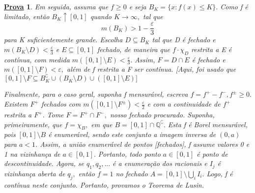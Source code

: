 \documentclass{article}
\newtheorem*{proof*}{\underline{Prova}}
\begin{document}
\begin{proof*}
  Em seguida, assuma que \(f\geq 0\) e seja \(B_{K} = \{x: f(x) \leq K\}.\) Como f é limitado, então \(B_{K}\uparrow [0, 1]\) quando \(K\to \infty,\) tal que 
    \[
      m(B_{K}) > 1 - \frac{\varepsilon }{3}
    \]
    para K suficientemente grande. Escolha \(D\subseteq B_{K}\) tal que D é fechado e \(m(B_{K}\setminus{D}) < \frac{\varepsilon }{3}\) e \(E\subseteq [0, 1]\) fechado, de maneira que 
    \(f \cdot \chi_{D}\) restrita a E é contínua, com medida \(m([0, 1]\setminus{E}) < \frac{\varepsilon }{3}.\) Assim, \(F = D\cap E\) é fechado e \(m([0, 1]\setminus{F}) < \varepsilon ,\) 
    além de f restrita a F ser contínua. [Aqui, foi usado que \([0,1]\setminus{F}\subseteq B_{K}^{\complement}\cup (B_{K}\setminus{D})\cup ([0, 1]\setminus{E})]\)

    Finalmente, para o caso geral, suponha f mensurável, escreva \(f = f^{+} - f^{-}, f^{\pm} \geq 0.\) Existem \(F^{+}\) fechados com \(m([0, 1]\setminus{F^{\pm}}) < \frac{\varepsilon }{2}\) e com a continuidade 
    de \(f^{+}\) restrita a \(F^{+}.\) Tome \(F = F^{+}\cap F^{-},\) nosso fechado procurado. Suponha, primeiramente, que \(f=\chi_{B},\) em que \(B = [0, 1]\cap \mathbb{Q}^{\complement}.\) Esta f é Borel mensurável, pois 
    \([0, 1]\setminus{B}\) é enumerável, sendo este conjunto a imagem inversa de \((0, a)\) para \(a < 1\). Assim, a união enumerável de pontos [fechados], f assume valores 0 e 1 na vizinhança de \(a\in [0, 1].\) Portanto, 
    todo ponto \(a\in [0, 1]\) é ponto de descontinuidade. Agora, se \(q_1, q_2, \dotsc \) é a enumeração dos racionais e \(I_{j}\) é vizinhança aberta de \(q_{j},\) então \(f=1\) no fechado \(A = [0, 1]\setminus{\bigcup_{i}^{}I_{i}.}\)
    Logo, f é contínua neste conjunto. Portanto, provamos o Teorema de Lusin.
\end{proof*}
\end{document}
